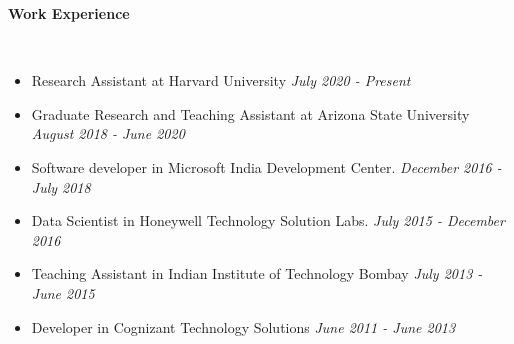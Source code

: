 \documentclass[a4paper,11pt]{article}
\newcommand{\lsep}{-0.5cm}
\newcommand{\resheading}[1]{{\small \colorbox{mygrey}{\begin{minipage}{0.975\textwidth}{\textbf{#1 \vphantom{p\^{E}}}}\end{minipage}}}}
\begin{document}
	
	\resheading{\textbf{\large Work Experience}}\\[\lsep]
	\begin{description}
		\item 
		\begin{itemize}
			\item Research Assistant at Harvard University \hfill \textit{July 2020 - Present}
		\end{itemize}
		\item 
		\begin{itemize}
			\item Graduate Research and Teaching Assistant at Arizona State University \hfill \textit{August 2018 - June 2020}
		\end{itemize}
		\item 
		\begin{itemize}
			\item Software developer in Microsoft India Development Center. \hfill \textit{December 2016 - July 2018}
		\end{itemize}
		\item 
		\begin{itemize}
			\item Data Scientist in Honeywell Technology Solution Labs. \hfill \textit{July 2015 - December 2016}
		\end{itemize}
		\item 
		\begin{itemize}
			\item Teaching Assistant in Indian Institute of Technology Bombay \hfill \textit{July 2013 - June 2015}
		\end{itemize}
		\item 
		\begin{itemize}
			\item Developer in Cognizant Technology Solutions \hfill \textit{June 2011 - June 2013}
		\end{itemize}
	\end{description}
	
\end{document}
